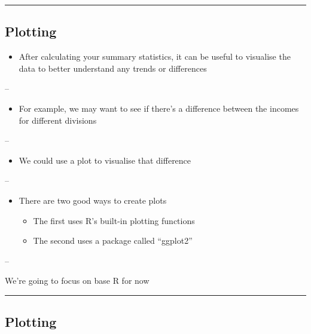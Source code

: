 \documentclass[]{article}
\providecommand{\tightlist}{%
  \setlength{\itemsep}{0pt}\setlength{\parskip}{0pt}}
\begin{document}
\begin{center}\rule{0.5\linewidth}{\linethickness}\end{center}

\hypertarget{plotting}{%
\subsection{Plotting}\label{plotting}}

\begin{itemize}
\tightlist
\item
  After calculating your summary statistics, it can be useful to
  visualise the data to better understand any trends or differences
\end{itemize}

--

\begin{itemize}
\tightlist
\item
  For example, we may want to see if there's a difference between the
  incomes for different divisions
\end{itemize}

--

\begin{itemize}
\tightlist
\item
  We could use a plot to visualise that difference
\end{itemize}

--

\begin{itemize}
\tightlist
\item
  There are two good ways to create plots

  \begin{itemize}
  \tightlist
  \item
    The first uses R's built-in plotting functions
  \item
    The second uses a package called ``ggplot2''
  \end{itemize}
\end{itemize}

--

We're going to focus on base R for now

\begin{center}\rule{0.5\linewidth}{\linethickness}\end{center}

\hypertarget{plotting-1}{%
\subsection{Plotting}\label{plotting-1}}
\end{document}
